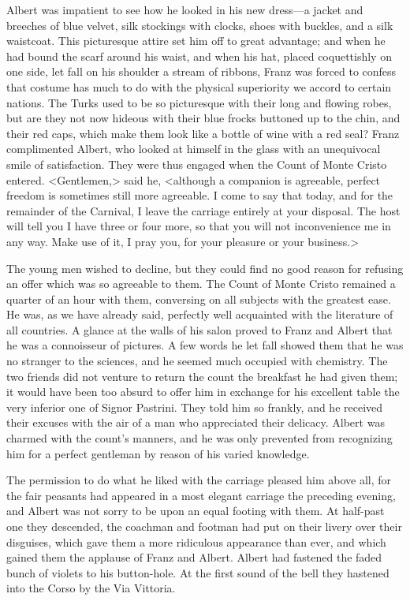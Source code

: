  Albert was impatient to see how he looked in his new dress—a jacket and breeches of blue velvet, silk stockings with clocks, shoes with buckles, and a silk waistcoat. This picturesque attire set him off to great advantage; and when he had bound the scarf around his waist, and when his hat, placed coquettishly on one side, let fall on his shoulder a stream of ribbons, Franz was forced to confess that costume has much to do with the physical superiority we accord to certain nations. The Turks used to be so picturesque with their long and flowing robes, but are they not now hideous with their blue frocks buttoned up to the chin, and their red caps, which make them look like a bottle of wine with a red seal? Franz complimented Albert, who looked at himself in the glass with an unequivocal smile of satisfaction. They were thus engaged when the Count of Monte Cristo entered.  <Gentlemen,> said he, <although a companion is agreeable, perfect freedom is sometimes still more agreeable. I come to say that today, and for the remainder of the Carnival, I leave the carriage entirely at your disposal. The host will tell you I have three or four more, so that you will not inconvenience me in any way. Make use of it, I pray you, for your pleasure or your business.> 

 The young men wished to decline, but they could find no good reason for refusing an offer which was so agreeable to them. The Count of Monte Cristo remained a quarter of an hour with them, conversing on all subjects with the greatest ease. He was, as we have already said, perfectly well acquainted with the literature of all countries. A glance at the walls of his salon proved to Franz and Albert that he was a connoisseur of pictures. A few words he let fall showed them that he was no stranger to the sciences, and he seemed much occupied with chemistry. The two friends did not venture to return the count the breakfast he had given them; it would have been too absurd to offer him in exchange for his excellent table the very inferior one of Signor Pastrini. They told him so frankly, and he received their excuses with the air of a man who appreciated their delicacy. Albert was charmed with the count's manners, and he was only prevented from recognizing him for a perfect gentleman by reason of his varied knowledge. 

 The permission to do what he liked with the carriage pleased him above all, for the fair peasants had appeared in a most elegant carriage the preceding evening, and Albert was not sorry to be upon an equal footing with them. At half-past one they descended, the coachman and footman had put on their livery over their disguises, which gave them a more ridiculous appearance than ever, and which gained them the applause of Franz and Albert. Albert had fastened the faded bunch of violets to his button-hole. At the first sound of the bell they hastened into the Corso by the Via Vittoria. 

